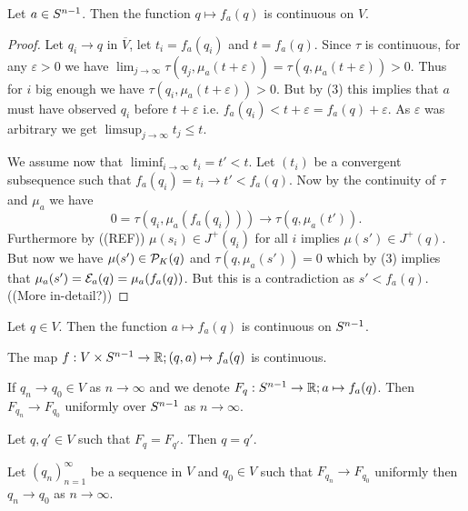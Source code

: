 \begin{lemma}\label{lem:qcont} Let $a\in S^{n-1}$. Then the function $q\mapsto f_a(q)$ is continuous on $V$.
\end{lemma}
\begin{proof}
    Let $q_i\to q$ in $\overline{V}$, let $t_i = f_a(q_i)$ and $t=f_a(q)$. Since $\tau$ is continuous, for any $\varepsilon>0$ we have $\lim_{j\to \infty} \tau(q_j,\mu_a(t+\varepsilon)) = \tau(q,\mu_a(t+\varepsilon)) > 0$. Thus for $i$ big enough we have $\tau(q_i,\mu_a(t+\varepsilon))>0$. But by (3) this implies that $a$ must have observed $q_i$ before $t+\varepsilon$ i.e. $f_a(q_i)<t+\varepsilon = f_a(q) + \varepsilon$. As $\varepsilon$ was arbitrary we get $\limsup_{j\to \infty} t_j \leq t$.

    We assume now that $\liminf_{i\to \infty} t_i=t'<t$. Let $(t_i)$ be a convergent subsequence such that $f_a(q_i) = t_i \to t' < f_a(q)$. Now by the continuity of $\tau$ and $\mu_a$ we have 
    \[
    0=\tau(q_i,\mu_a(f_a(q_i)))\to \tau(q,\mu_a(t')).
    \]
    Furthermore by ((REF)) $\mu(s_i)\in J^+(q_i)$ for all $i$ implies $\mu(s')\in J^+(q)$. But now we have $\mu(s')\in \mathcal{P}_K(q)$ and $\tau(q,\mu_a(s'))=0$ which by (3) implies that $\mu_a(s') = \mathcal{E}_a(q) = \mu_a(f_a(q))$. But this is a contradiction as $s'<f_a(q)$. ((More in-detail?))
\end{proof}

\begin{lemma}\label{lem:acont} Let $q\in V$. Then the function $a\mapsto f_a(q)$ is continuous on $S^{n-1}$.
\end{lemma}

\begin{corollary}\label{cor:fcont} 
    The map $f:V\times S^{n-1}\to\mathbb{R}; (q,a)\mapsto f_a(q)$ is continuous.
\end{corollary}

\begin{proposition}\label{cor:funif}
    If $q_n \to q_0\in V$ as $n\to \infty$ and we denote $F_q:S^{n-1}\to\mathbb{R};a\mapsto f_a(q)$. Then $F_{q_n}\to F_{q_0}$ uniformly over $S^{n-1}$ as $n\to \infty$.
\end{proposition}

\begin{proposition}\label{prop:finj}
    Let $q,q'\in V$ such that $F_q=F_{q'}$. Then $q=q'$.
\end{proposition}

\begin{proposition}\label{prop:frevcont} Let 
    $(q_n)_{n=1}^{\infty}$ be a sequence in $V$ and $q_0\in V$ such that $F_{q_n}\to F_{q_0}$ uniformly then $q_n \to q_0$ as $n\to \infty$.
\end{proposition}

